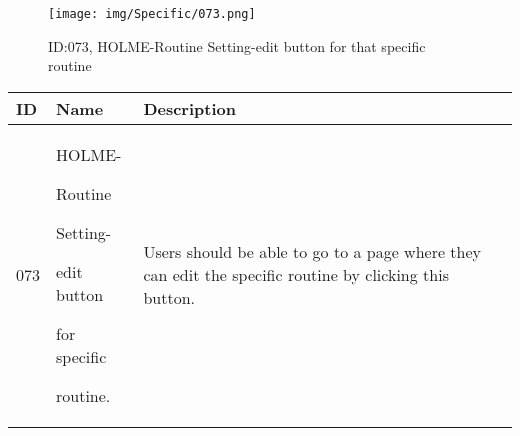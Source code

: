 \documentclass[conference]{IEEEtran}
\begin{document}
\begin{enumerate}
\begin{figure}[h]
\centering
\texttt{[image: img/Specific/073.png]}
\caption{ID:073, HOLME-Routine Setting-edit button for that specific routine}
\end{figure}
\begin{table}[h]
\def\arraystretch{1.2} \small
    \begin{tabular}{|p{1cm}|p{1.8cm}|p{5.0cm}|}
        \hline
        ID & Name & Description\\ \hline
         073 \par  & HOLME-\par Routine \par Setting- \par edit button \par  for specific \par  routine.  & 
Users should be able to go to a page where they can edit the specific routine by clicking this button. \\ \hline
    \end{tabular}
\end{table}



\end{enumerate}
\end{document}
